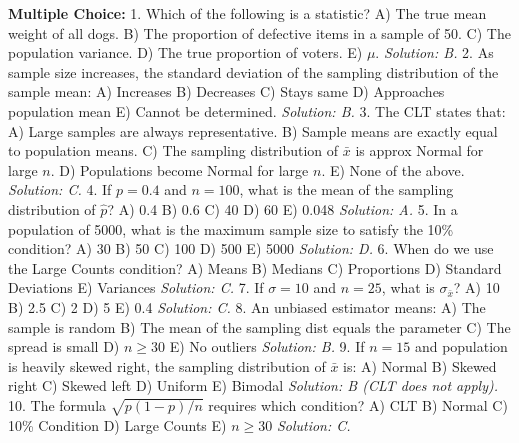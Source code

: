\begin{workbookbox}
\textbf{Multiple Choice:}
1. Which of the following is a statistic?
A) The true mean weight of all dogs. B) The proportion of defective items in a sample of 50. C) The population variance. D) The true proportion of voters. E) $\mu$.
\textit{Solution: B.}
2. As sample size increases, the standard deviation of the sampling distribution of the sample mean:
A) Increases B) Decreases C) Stays same D) Approaches population mean E) Cannot be determined.
\textit{Solution: B.}
3. The CLT states that:
A) Large samples are always representative. B) Sample means are exactly equal to population means. C) The sampling distribution of $\bar{x}$ is approx Normal for large $n$. D) Populations become Normal for large $n$. E) None of the above.
\textit{Solution: C.}
4. If $p=0.4$ and $n=100$, what is the mean of the sampling distribution of $\hat{p}$?
A) 0.4 B) 0.6 C) 40 D) 60 E) 0.048
\textit{Solution: A.}
5. In a population of 5000, what is the maximum sample size to satisfy the 10\% condition?
A) 30 B) 50 C) 100 D) 500 E) 5000
\textit{Solution: D.}
6. When do we use the Large Counts condition?
A) Means B) Medians C) Proportions D) Standard Deviations E) Variances
\textit{Solution: C.}
7. If $\sigma = 10$ and $n=25$, what is $\sigma_{\bar{x}}$?
A) 10 B) 2.5 C) 2 D) 5 E) 0.4
\textit{Solution: C.}
8. An unbiased estimator means:
A) The sample is random B) The mean of the sampling dist equals the parameter C) The spread is small D) $n \geq 30$ E) No outliers
\textit{Solution: B.}
9. If $n=15$ and population is heavily skewed right, the sampling distribution of $\bar{x}$ is:
A) Normal B) Skewed right C) Skewed left D) Uniform E) Bimodal
\textit{Solution: B (CLT does not apply).}
10. The formula $\sqrt{p(1-p)/n}$ requires which condition?
A) CLT B) Normal C) 10\% Condition D) Large Counts E) $n \geq 30$
\textit{Solution: C.}


\end{workbookbox}
